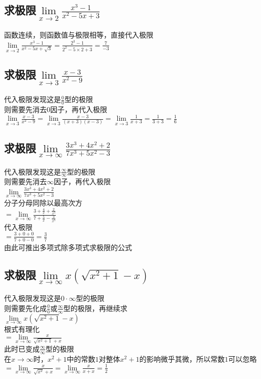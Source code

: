 \documentclass{article}
\begin{document}
\begin{flushleft}
	\subsection{
	求极限$\lim\limits_{x\to 2}\frac{x^3-1}{x^2-5x+3}$
	}
	函数连续，则函数值与极限相等，直接代入极限\\
	$\lim\limits_{x\to 2}\frac{x^3-1}{x^2-5x+\sqrt3}=\frac{2^3-1}{2^2-5\times2+3}=\frac{7}{-3}$\\
	
	\subsection{
	求极限$\lim\limits_{x\to 3}\frac{x-3}{x^2-9}$
	}
	代入极限发现这是$\frac{0}{0}$型的极限\\
	则需要先消去$0$因子，再代入极限\\
	$\lim\limits_{x\to 3}\frac{x-3}{x^2-9}=\lim\limits_{x\to 3}\frac{x-3}{(x+3)(x-3)}=\lim\limits_{x\to 3}\frac{1}{x+3}=\frac{1}{3+3}=\frac{1}{6}$\\
	
	\subsection{
	求极限$\lim\limits_{x\to \infty}\frac{3x^3+4x^2+2}{7x^3+5x^2-3}$
	}
	代入极限发现这是$\frac{\infty}{\infty}$型的极限\\
	则需要先消去$\infty$因子，再代入极限\\
	$\lim\limits_{x\to \infty}\frac{3x^3+4x^2+2}{7x^3+5x^2-3}$\\
	分子分母同除以最高次方\\
	$=\lim\limits_{x\to \infty}\frac{3+\frac{4}{x}+\frac{2}{x^3}}{7+\frac{5}{x}-\frac{3}{x^3}}$\\
	代入极限\\
	$=\frac{3+0+0}{7+0-0}=\frac{3}{7}$\\
	由此可推出多项式除多项式求极限的公式\\
	
	\subsection{
	求极限$\lim\limits_{x\to \infty}x(\sqrt{x^2+1}-x)$
	}
	代入极限发现这是$0\cdot\infty$型的极限\\
	则需要先化成$\frac{0}{0}$或$\frac{\infty}{\infty}$型的极限，再继续求\\
	$\lim\limits_{x\to \infty}x(\sqrt{x^2+1}-x)$\\
	根式有理化\\
	$=\lim\limits_{x\to \infty}\frac{x}{\sqrt{x^2+1}+x}$\\
	此时已变成$\frac{\infty}{\infty}$型的极限\\
	在$x\to\infty$时，$x^2+1$中的常数$1$对整体$x^2+1$的影响微乎其微，所以常数$1$可以忽略\\
	$=\lim\limits_{x\to \infty}\frac{x}{\sqrt{x^2}+x}
	=\lim\limits_{x\to \infty}\frac{x}{x+x}=\frac{1}{2}$\\
	

\end{flushleft}
\end{document}
